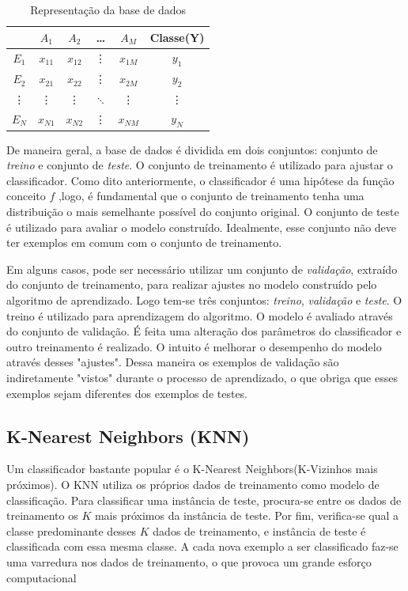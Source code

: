 \begin{table}[]
	\centering
	\begin{tabular}{c|cccc|c}
		\hline
		& $A_1$ & $A_2$ & \dots & $A_M$  & Classe(Y) \\
		\hline 
		\hline
		$E_1$ & $x_{11}$ & $x_{12}$ & \vdots & $x_{1M}$ & $y_1$ \\
		$E_2$ & $x_{21}$ & $x_{22}$ & \vdots & $x_{2M}$ & $y_2$ \\
		\vdots & \vdots & \vdots &  $\ddots$ & \vdots & \vdots \\
		$E_N$ & $x_{N1}$ & $x_{N2}$ & \vdots & $x_{NM}$ & $y_N$ \\
		\hline
		
		
	\end{tabular}	
	\caption{Representação da base de dados}
	\label{table-dataset}
\end{table}


De maneira geral, a base de dados é dividida em dois conjuntos: conjunto de \textit{treino} e conjunto de \textit{teste}. O conjunto de treinamento é utilizado para ajustar o classificador. Como dito anteriormente, o classificador é uma hipótese da função conceito $f$ ,logo, é fundamental que o conjunto de treinamento tenha uma distribuição o mais semelhante possível do conjunto original.  O conjunto de teste é utilizado para avaliar o modelo construído. Idealmente, esse conjunto não deve ter exemplos em comum com o conjunto de treinamento.

Em alguns casos, pode ser necessário utilizar um conjunto de \textit{validação}, extraído do conjunto de treinamento, para realizar ajustes no modelo construído pelo algoritmo de aprendizado. Logo tem-se três conjuntos: \textit{treino}, \textit{validação} e \textit{teste}. O treino é utilizado para aprendizagem do algoritmo. O modelo é avaliado através do conjunto de validação. É feita uma alteração dos parâmetros do classificador e outro treinamento é realizado. O intuito é melhorar o desempenho do modelo através desses "ajustes". Dessa maneira os exemplos de validação são indiretamente "vistos" durante o processo de aprendizado, o que obriga que esses exemplos sejam diferentes dos exemplos de testes.


\subsection{K-Nearest Neighbors (KNN)}
Um classificador bastante popular é o K-Nearest Neighbors(K-Vizinhos mais próximos). O KNN utiliza os próprios dados de treinamento como modelo de classificação. Para classificar uma instância de teste, procura-se entre os dados de treinamento os $K$ mais próximos da instância de teste. Por fim, verifica-se qual a classe predominante desses $K$ dados de treinamento, e instância de teste é classificada com essa mesma classe. A cada nova exemplo a ser classificado faz-se uma varredura nos dados de treinamento, o que provoca um grande esforço computacional

